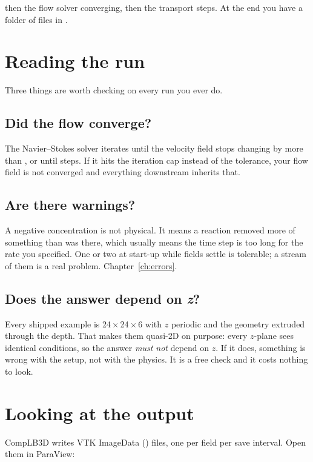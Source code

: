 then the flow solver converging, then the transport steps. At the end you have
a folder of  files in .

\section{Reading the run}

Three things are worth checking on every run you ever do.

\subsection{Did the flow converge?}

The Navier--Stokes solver iterates until the velocity field stops changing by
more than , or until  steps. If it hits
the iteration cap instead of the tolerance, your flow field is not converged
and everything downstream inherits that.

\subsection{Are there \code{[NEG!]} warnings?}

A negative concentration is not physical. It means a reaction removed more of
something than was there, which usually means the time step is too long for the
rate you specified. One or two at start-up while fields settle is tolerable;
a stream of them is a real problem. Chapter~\ref{ch:errors}.

\subsection{Does the answer depend on \textit{z}?}

Every shipped example is 24\,$\times$\,24\,$\times$\,6 with $z$ periodic and
the geometry extruded through the depth. That makes them quasi-2D on purpose:
every $z$-plane sees identical conditions, so the answer \emph{must not} depend
on $z$. If it does, something is wrong with the setup, not with the physics.
It is a free check and it costs nothing to look.

\section{Looking at the output}

CompLB3D writes VTK ImageData () files, one per field per save
interval. Open them in ParaView:

